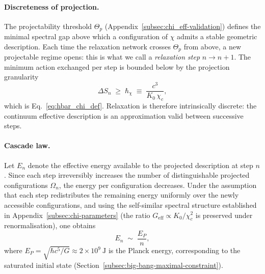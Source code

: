     \paragraph{Discreteness of projection.}
      The projectability threshold $\Theta_p$ (Appendix~\ref{subsec:chi_eff-validation}) defines the
      minimal spectral gap above which a configuration of $\chi$ admits a stable geometric description.
      Each time the relaxation network crosses $\Theta_p$ from above, a new
      projectable regime opens: this is what we call a \emph{relaxation step} $n \to n+1$.
      The minimum action exchanged per step is bounded below by the projection granularity
    \begin{equation}
      \label{eq:rc-delta-S}
      \Delta S_n \;\geq\; \hbar_\chi
      \;\equiv\;
      \frac{c^3}{K_0\,\chi_c},
      \end{equation}
      which is Eq.~\eqref{eq:hbar_chi_def}.
      Relaxation is therefore intrinsically discrete: the continuum effective
      description is an approximation valid between successive steps.

    \paragraph{Cascade law.}
      Let $E_n$ denote the effective energy available to the projected description at step $n$.
      Since each step irreversibly increases the number of distinguishable
      projected configurations $\Omega_n$, the energy per configuration decreases.
      Under the assumption that each step redistributes the remaining energy
      uniformly over the newly accessible configurations, and using the
      self-similar spectral structure established in Appendix~\ref{subsec:chi-parameters}
      (the ratio $G_\mathrm{eff} \propto K_0/\chi_c^2$ is preserved under renormalisation), one obtains
    \begin{equation}
      \label{eq:rc-cascade}
      E_n \;\sim\; \frac{E_P}{n},
      \end{equation}
      where $E_P = \sqrt{\hbar c^5/G} \approx 2 \times 10^9~\mathrm{J}$
      is the Planck energy, corresponding to the saturated initial state
      (Section~\ref{subsec:big-bang-maximal-constraint}).

